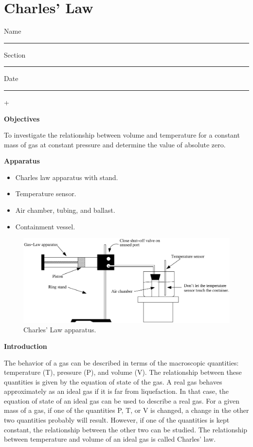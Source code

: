 
\section{Charles' Law}

Name \rule{2.0in}{0.1pt}\hfill{}Section \rule{1.0in}{0.1pt}\hfill{}Date
\rule{1.0in}{0.1pt}+

\textbf{Objectives} 

To investigate the relationship between volume and temperature for
a constant mass of gas at constant pressure and determine the value
of absolute zero.

\textbf{Apparatus} 

\begin{itemize}
\item Charles law apparatus with stand.
\item Temperature sensor.
\item Air chamber, tubing, and ballast.
\item Containment vessel.
\end{itemize}
\vspace{0.3cm}

\begin{figure}[hbt]
\begin{center}
\includegraphics[width=6.0in]{charles_law_fig1.eps}
\caption{Charles' Law apparatus.}
\end{center}
\end{figure}

\textbf{Introduction}

The behavior of a gas can be described in terms of the macroscopic quantities:
temperature (T), pressure (P), and volume (V). The relationship between these
quantities is given by the equation of state of the gas. A real gas behaves
approximately as an ideal gas if it is far from liquefaction. In that case,
the equation of state of an ideal gas can be used to describe a real gas. For
a given mass of a gas, if one of the quantities P, T, or V is changed, a change
in the other two quantities probably will result. However, if one of the quantities
is kept constant, the relationship between the other two can be studied. The
relationship between temperature and volume of an ideal gas is called Charles' law.

